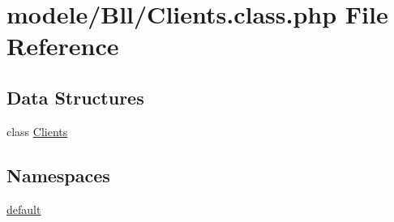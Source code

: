 \hypertarget{_clients_8class_8php}{}\section{modele/\+Bll/\+Clients.class.\+php File Reference}
\label{_clients_8class_8php}
\subsection*{Data Structures}
\begin{DoxyCompactItemize}
\item 
class \hyperlink{class_clients}{Clients}
\end{DoxyCompactItemize}
\subsection*{Namespaces}
\begin{DoxyCompactItemize}
\item 
 \hyperlink{namespacedefault}{default}
\end{DoxyCompactItemize}
